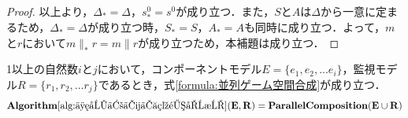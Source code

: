 \begin{proof}
    以上より，$\Delta_* = \Delta$，$s^0_* = s^0$が成り立つ．また，$S$と$A$は$\Delta$から一意に定まるため，$\Delta_* = \Delta$が成り立つ時，$S_* = S$，$A_* = A$も同時に成り立つ．よって，$m$と$r$において$m \parallel_* r = m \parallel r$が成り立つため，本補題は成り立つ．
\end{proof}


\begin{lem}
    \label{lem:アルゴリズムが並列合成を行っていることの証明}
    1以上の自然数$i$と$j$において，コンポーネントモデル$E = \{e_1, e_2, ... e_i\}$，監視モデル$R = \{r_1, r_2, ... r_j\}$であるとき，式\ref{formula:並列ゲーム空間合成}が成り立つ．
    \renewcommand{\baselinestretch}{0.0}
    \allowdisplaybreaks[4]
    \begin{equation}
    \label{formula:並列ゲーム空間合成}
    {\bf Algorithm \ref{alg:並列ゲーム空間合成}(E, R)} = {\bf Parallel Composition(E \cup R)}
    \end{equation}
    \allowdisplaybreaks[0]
    \renewcommand{\baselinestretch}{1}
\end{lem}
